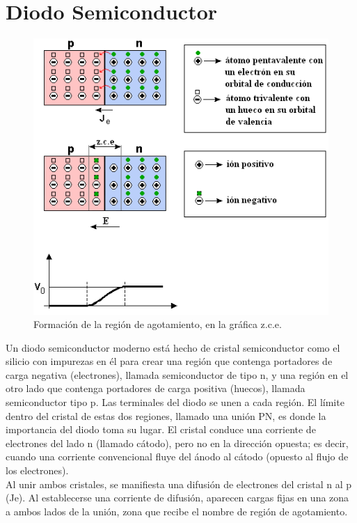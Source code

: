 \section{Diodo Semiconductor}

\begin{figure}[h!]
\centering
\includegraphics[scale=0.5]{DiodoSem.png}
\caption{Formación de la región de agotamiento, en la gráfica z.c.e.}
\label{fig:diodoSem}
\end{figure}

Un diodo semiconductor moderno está hecho de cristal semiconductor como el silicio con impurezas en él para crear una región que contenga portadores de carga negativa (electrones), llamada semiconductor de tipo n, y una región en el otro lado que contenga portadores de carga positiva (huecos), llamada semiconductor tipo p. Las terminales del diodo se unen a cada región. El límite dentro del cristal de estas dos regiones, llamado una unión PN, es donde la importancia del diodo toma su lugar. El cristal conduce una corriente de electrones del lado n (llamado cátodo), pero no en la dirección opuesta; es decir, cuando una corriente convencional fluye del ánodo al cátodo (opuesto al flujo de los electrones).\citep{diodoWiki}\\

Al unir ambos cristales, se manifiesta una difusión de electrones del cristal n al p (Je). Al establecerse una corriente de difusión, aparecen cargas fijas en una zona a ambos lados de la unión, zona que recibe el nombre de región de agotamiento.\citep{diodoWiki}\\

